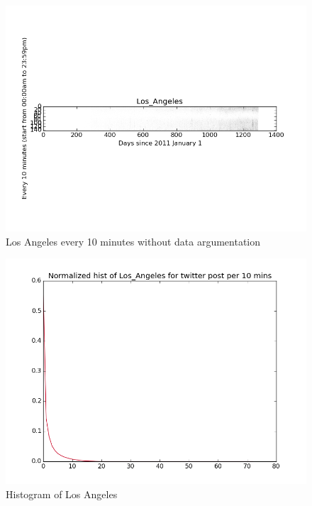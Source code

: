 \documentclass[a4paper,12pt]{article}
\begin{document}
\begin{figure}[H]
  \begin{center}
      \includegraphics[scale=0.8]{1Los_Angeles.png}
\end{center}
\caption{Los Angeles every 10 minutes without data argumentation}
 \label {fig:2}
 \end{figure}
 
 \begin{figure}[H]
  \begin{center}
      \includegraphics[scale=0.8]{1Los_Angeleshisto.png}
\end{center}
\caption{Histogram of Los Angeles }
 \label {fig:2}
 \end{figure}
 
\end{document}
